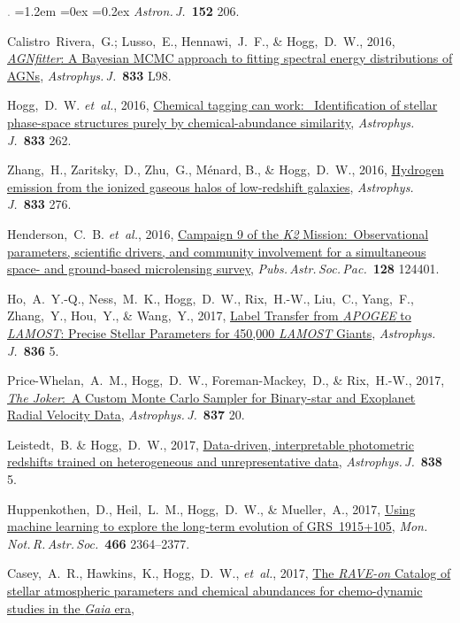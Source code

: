 \documentclass[10pt,letterpaper]{article}
\newcommand{\acronym}[1]{{\small{#1}}}
\newcommand{\foreign}[1]{\textsl{#1}}
\newcommand{\etal}{\foreign{et~al.}}
\newcommand{\project}[1]{\textsl{#1}}
\newcommand{\doi}[2]{\href{http://dx.doi.org/#1}{{#2}}}
\newcommand{\deemph}[1]{\textcolor{grey}{\footnotesize{#1}}}
\newcommand{\pubnumber}[1]{\deemph{{#1}.}}
\newcounter{refpubnum}
\newcommand{\hogglist}{%
    \rightmargin=0in
    \leftmargin=1.2em
    \topsep=0ex
    \partopsep=0pt
    \itemsep=0.2ex
    \parsep=0pt
    \itemindent=-1.0\leftmargin
    \listparindent=0.0\leftmargin
    \settowidth{\labelsep}{~}
    \usecounter{refpubnum}
  }
\begin{document}
\begin{list}{\pubnumber{\therefpubnum}}{\hogglist}
\textit{Astron.\,J.}\ \textbf{152} 206.
\item
Calistro~Rivera,~G.; Lusso,~E., Hennawi,~J.~F., \& Hogg,~D.~W., 2016,
\doi{10.3847/1538-4357/833/1/98}{\project{AGNfitter}: A Bayesian MCMC approach to fitting spectral energy distributions of AGNs},
\textit{Astrophys.\,J.}\ \textbf{833} L98.
\item
Hogg,~D.~W. \etal, 2016,
\doi{10.3847/1538-4357/833/2/262}{Chemical tagging can work:\ %
Identification of stellar phase-space structures purely by chemical-abundance similarity},
\textit{Astrophys.\,J.}\ \textbf{833} 262.
\item
Zhang,~H., Zaritsky,~D., Zhu,~G., M\'enard, B., \& Hogg,~D.~W., 2016,
\doi{10.3847/1538-4357/833/2/276}{Hydrogen emission from the ionized gaseous halos of low-redshift galaxies},
\textit{Astrophys.\,J.}\ \textbf{833} 276.
\item
Henderson,~C.~B. \etal, 2016,
\doi{10.1088/1538-3873/128/970/124401}{Campaign 9 of the \project{\acronym{K2}} Mission:\ 
Observational parameters, scientific drivers, and community involvement
for a simultaneous space- and ground-based microlensing survey},
\textit{Pubs.\,Astr.\,Soc.\,Pac.}\ \textbf{128} 124401.
\item
Ho,~A.~Y.-Q., Ness,~M.~K., Hogg,~D.~W., Rix,~H.-W., Liu,~C., Yang,~F., Zhang,~Y.,
Hou,~Y., \& Wang,~Y., 2017,
\doi{10.3847/1538-4357/836/1/5}{Label Transfer from \project{\acronym{APOGEE}} to \project{\acronym{LAMOST}}: Precise Stellar Parameters for 450,000 \project{\acronym{LAMOST}} Giants},
\textit{Astrophys.\,J.}\ \textbf{836} 5.
\item
Price-Whelan,~A.~M., Hogg,~D.~W., Foreman-Mackey,~D., \& Rix,~H.-W., 2017,
\doi{10.3847/1538-4357/aa5e50}{\project{The Joker}:\ A Custom Monte Carlo Sampler for Binary-star and Exoplanet Radial Velocity Data},
\textit{Astrophys.\,J.}\ \textbf{837} 20.
\item
Leistedt,~B. \& Hogg,~D.~W., 2017,
\doi{10.3847/1538-4357/aa6332}{Data-driven, interpretable photometric redshifts trained on heterogeneous and unrepresentative data},
\textit{Astrophys.\,J.}\ \textbf{838} 5.
\item
Huppenkothen,~D., Heil,~L.~M., Hogg,~D.~W., \& Mueller,~A., 2017,
\doi{10.1093/mnras/stw3190}{Using machine learning to explore the long-term evolution of \acronym{GRS~1915+105}},
\textit{Mon.\,Not.\,R.\,Astr.\,Soc.}\ \textbf{466} 2364--2377.
\item
Casey,~A.~R., Hawkins,~K., Hogg,~D.~W., \etal, 2017,
\doi{10.3847/1538-4357/aa69c2}{The \project{\acronym{RAVE}-on} Catalog of stellar atmospheric parameters and chemical abundances for chemo-dynamic studies in the \project{Gaia} era},

\end{list}
\end{document}
